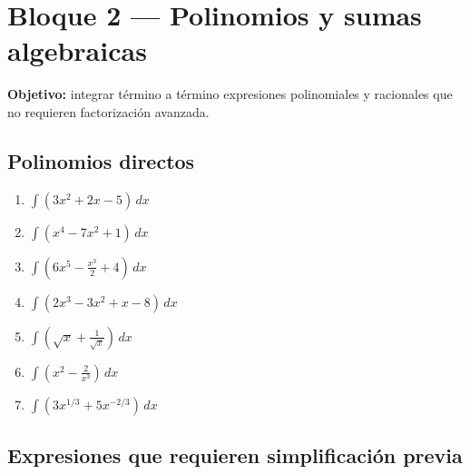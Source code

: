 \documentclass[12pt, letterpaper]{article}
\newcommand{\dx}{\,dx}
\begin{document}
\vspace{4pt}

\section{Bloque 2 — Polinomios y sumas algebraicas}

\begin{cuadroinfo}
\small\textbf{Objetivo:} integrar término a término expresiones polinomiales y
racionales que no requieren factorización avanzada.
\end{cuadroinfo}

\vspace{4pt}

\subsection{Polinomios directos}

\begin{enumerate}[label=\textbf{\arabic*.}, leftmargin=*, itemsep=10pt, start=17]

  \item \facil\quad
    $\displaystyle\int (3x^2 + 2x - 5)\dx$

  \item \facil\quad
    $\displaystyle\int (x^4 - 7x^2 + 1)\dx$

  \item \facil\quad
    $\displaystyle\int \left(6x^5 - \frac{x^3}{2} + 4\right)\dx$

  \item \facil\quad
    $\displaystyle\int \left(2x^3 - 3x^2 + x - 8\right)\dx$

  \item \medio\quad
    $\displaystyle\int \left(\sqrt{x} + \frac{1}{\sqrt{x}}\right)\dx$

  \item \medio\quad
    $\displaystyle\int \left(x^2 - \frac{2}{x^3}\right)\dx$

  \item \medio\quad
    $\displaystyle\int \left(3x^{1/3} + 5x^{-2/3}\right)\dx$

\end{enumerate}

\subsection{Expresiones que requieren simplificación previa}
\end{document}
